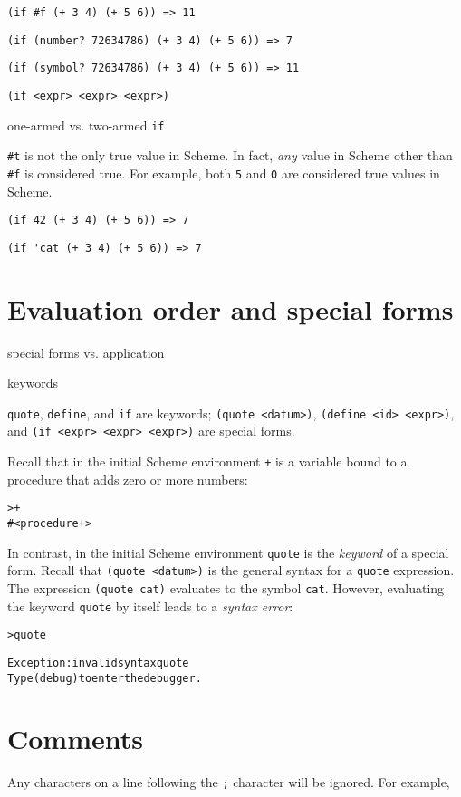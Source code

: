 \documentclass{book}
\begin{document}
\verb|(if #f (+ 3 4) (+ 5 6)) => 11|

\verb|(if (number? 72634786) (+ 3 4) (+ 5 6)) => 7|

\verb|(if (symbol? 72634786) (+ 3 4) (+ 5 6)) => 11|

\verb|(if <expr> <expr> <expr>)|

one-armed vs. two-armed \verb|if|

\verb|#t| is not the only true value in Scheme.
In fact, \emph{any} value in Scheme other than \verb|#f| is considered true.
For example, both \verb|5| and \verb|0| are considered true values in Scheme.

\verb|(if 42 (+ 3 4) (+ 5 6)) => 7|

\verb|(if 'cat (+ 3 4) (+ 5 6)) => 7|

\section{Evaluation order and special forms}

special forms vs. application

keywords

\verb|quote|, \verb|define|, and \verb|if| are keywords; \verb|(quote <datum>)|, \verb|(define <id> <expr>)|, and \verb|(if <expr> <expr> <expr>)| are special forms.

Recall that in the initial Scheme environment \verb|+| is a variable bound to a procedure that adds zero or more numbers:

\begin{alltt}
> +
#<procedure +>
\end{alltt}

In contrast, in the initial Scheme environment \verb|quote| is the \emph{keyword} of a special form.  Recall that \verb|(quote <datum>)| is the general syntax for a \verb|quote| expression.  The expression \verb|(quote cat)| evaluates to the symbol \verb|cat|.  However, evaluating the keyword \verb|quote| by itself leads to a \emph{syntax error}:

\begin{alltt}
> quote

Exception: invalid syntax quote
Type (debug) to enter the debugger.
\end{alltt}


\section{Comments}

Any characters on a line following the \verb|;| character will be ignored.  For example,
\end{document}
